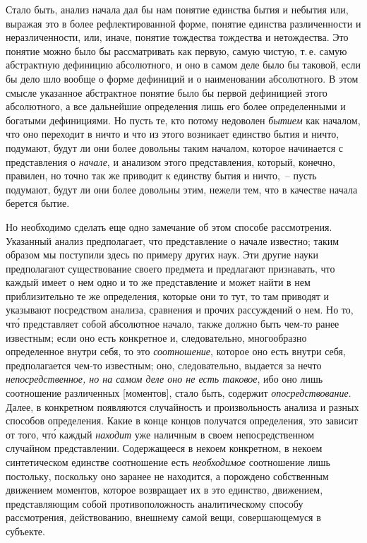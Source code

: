 Стало быть, анализ начала дал бы нам понятие единства
бытия и небытия или, выражая это в более рефлектированной
форме, понятие единства различенности и
неразличенности, или, иначе, понятие тождества тождества
и нетождества\endnotemark{}. Это понятие можно было бы рассматривать
как первую, самую чистую, т.\,е. самую абстрактную
дефиницию абсолютного, и оно в самом деле
было бы таковой, если бы дело шло вообще о форме дефиниций
и о наименовании абсолютного. В этом смысле
указанное абстрактное понятие было бы первой дефиницией
этого абсолютного, а все дальнейшие определения
лишь его более определенными и богатыми дефинициями.
Но пусть те, кто потому недоволен \emph{бытием} как началом,
что оно переходит в ничто и что из этого возникает единство
бытия и ничто, подумают, будут ли они более довольны
таким началом, которое начинается с представления
о \emph{начале}, и анализом этого представления, который,
конечно, правилен, но точно так же приводит
к единству бытия и ничто,~-- пусть подумают, будут ли
они более довольны этим, нежели тем, что в качестве
начала берется бытие.


Но необходимо сделать еще одно замечание об этом
способе рассмотрения. Указанный анализ предполагает,
что представление о начале известно; таким образом мы
поступили здесь по примеру других наук. Эти другие
науки предполагают существование своего предмета и
предлагают признавать, что каждый имеет о нем одно и
то же представление и может найти в нем приблизительно
те же определения, которые они то тут, то там приводят
и указывают посредством анализа, сравнения и прочих
рассуждений о нем. Но то, чт\'о представляет собой абсолютное
начало, также должно быть чем-то ранее известным;
если оно есть конкретное и, следовательно, многообразно
определенное внутри себя, то это \emph{соотношение},
которое оно есть внутри себя, предполагается чем-то
известным; оно, следовательно, выдается за нечто \emph{непосредственное,
но на самом деле оно не есть таковое}, ибо
оно лишь соотношение различенных [моментов], стало
быть, содержит \emph{опосредствование}. Далее, в конкретном
появляются случайность и произвольность анализа и разных
способов определения. Какие в конце концов получатся
определения, это зависит от того, чт\'о каждый \emph{находит}
уже наличным в своем непосредственном случайном
представлении. Содержащееся в некоем конкретном,
в некоем синтетическом единстве соотношение есть \emph{необходимое}
соотношение лишь постольку, поскольку оно
заранее не находится, а порождено собственным движением
моментов, которое возвращает их в это единство,
движением, представляющим собой противоположность
аналитическому способу рассмотрения, действованию,
внешнему самой вещи, совершающемуся в субъекте.

